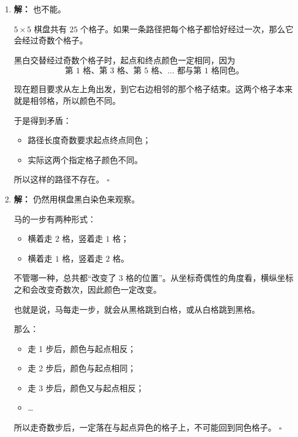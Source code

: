 \documentclass[11pt,a4paper,fontset=fandol]{ctexart}
\theoremstyle{formalexample}
\newenvironment{solution}{\par\noindent\textbf{解：}}{\hfill$\square$\par}
\begin{document}
\begin{enumerate}
\begin{solution}
  因此，不可能从左上角出发，到右下角结束，并且每个格子恰好经过一次。
  \end{solution}

  \item \begin{solution}
  也不能。

  $5\times 5$ 棋盘共有 $25$ 个格子。如果一条路径把每个格子都恰好经过一次，那么它会经过奇数个格子。

  黑白交替经过奇数个格子时，起点和终点颜色一定相同，因为
  \[
  \text{第 1 格、第 3 格、第 5 格、}\ldots\text{ 都与第 1 格同色。}
  \]

  现在题目要求从左上角出发，到它右边相邻的那个格子结束。这两个格子本来就是相邻格，所以颜色不同。

  于是得到矛盾：
  \begin{itemize}
    \item 路径长度奇数要求起点终点同色；
    \item 实际这两个指定格子颜色不同。
  \end{itemize}

  所以这样的路径不存在。
  \end{solution}

  \item \begin{solution}
  仍然用棋盘黑白染色来观察。

  马的一步有两种形式：
  \begin{itemize}
    \item 横着走 $2$ 格，竖着走 $1$ 格；
    \item 横着走 $1$ 格，竖着走 $2$ 格。
  \end{itemize}

  不管哪一种，总共都“改变了 $3$ 格的位置”。从坐标奇偶性的角度看，横纵坐标之和会改变奇数次，因此颜色一定改变。

  也就是说，马每走一步，就会从黑格跳到白格，或从白格跳到黑格。

  那么：
  \begin{itemize}
    \item 走 1 步后，颜色与起点相反；
    \item 走 2 步后，颜色与起点相同；
    \item 走 3 步后，颜色又与起点相反；
    \item \ldots
  \end{itemize}

  所以走奇数步后，一定落在与起点异色的格子上，不可能回到同色格子。
  \end{solution}


\end{enumerate}
\end{document}
